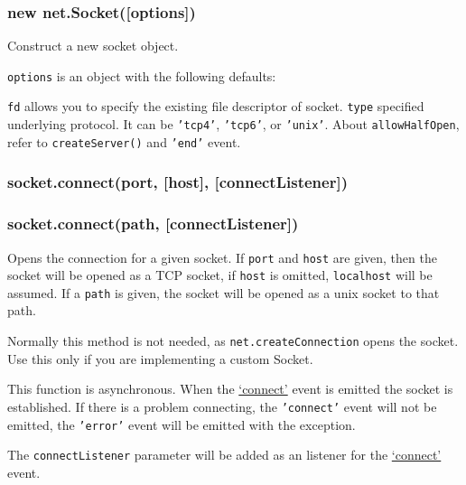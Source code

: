 \subsubsection{new net.Socket({[}options{]})}

Construct a new socket object.

\texttt{options} is an object with the following defaults:

\begin{Shaded}
\begin{Highlighting}[]
\NormalTok{\{ }
  \NormalTok{: }
\NormalTok{\}}
\end{Highlighting}
\end{Shaded}

\texttt{fd} allows you to specify the existing file descriptor of
socket. \texttt{type} specified underlying protocol. It can be
\texttt{'tcp4'}, \texttt{'tcp6'}, or \texttt{'unix'}. About
\texttt{allowHalfOpen}, refer to \texttt{createServer()} and
\texttt{'end'} event.

\subsubsection{socket.connect(port, {[}host{]}, {[}connectListener{]})}

\subsubsection{socket.connect(path, {[}connectListener{]})}

Opens the connection for a given socket. If \texttt{port} and
\texttt{host} are given, then the socket will be opened as a TCP socket,
if \texttt{host} is omitted, \texttt{localhost} will be assumed. If a
\texttt{path} is given, the socket will be opened as a unix socket to
that path.

Normally this method is not needed, as \texttt{net.createConnection}
opens the socket. Use this only if you are implementing a custom Socket.

This function is asynchronous. When the
\hyperref[net_event_connect]{`connect'} event is emitted the socket is
established. If there is a problem connecting, the \texttt{'connect'}
event will not be emitted, the \texttt{'error'} event will be emitted
with the exception.

The \texttt{connectListener} parameter will be added as an listener for
the \hyperref[net_event_connect]{`connect'} event.

